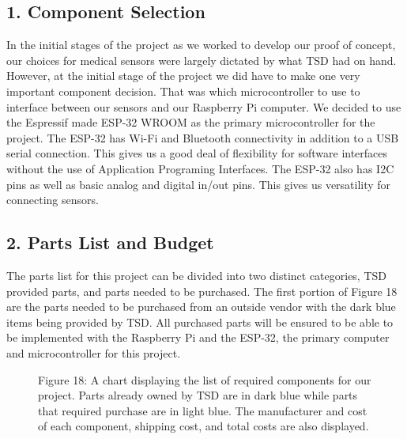 ﻿\documentclass[10pt]{article}
\begin{document}
\subsection{1. Component Selection}
In the initial stages of the project as we worked to develop our proof of concept, our choices for medical sensors were largely dictated by what TSD had on hand. However, at the initial stage of the project we did have to make one very important component decision. That was which microcontroller to use to interface between our sensors and our Raspberry Pi computer. We decided to use the Espressif made ESP-32 WROOM as the primary microcontroller for the project. The ESP-32 has Wi-Fi and Bluetooth connectivity in addition to a USB serial connection. This gives us a good deal of flexibility for software interfaces without the use of Application Programing Interfaces. The ESP-32 also has I2C pins as well as basic analog and digital in/out pins. This gives us versatility for connecting sensors.

\subsection{2. Parts List and Budget}
The parts list for this project can be divided into two distinct categories, TSD provided parts, and parts needed to be purchased. The first portion of Figure 18 are the parts needed to be purchased from an outside vendor with the dark blue items being provided by TSD. All purchased parts will be ensured to be able to  be implemented with the Raspberry Pi and the ESP-32, the primary computer and  microcontroller for this project.

%	 
%	 
%	 
%	 
%	 
%	 
%	 
%	 
%	 
\begin{figure}
\caption{ Figure 18: A chart displaying the list of required components for our project. Parts already owned by TSD are in dark blue while parts that required purchase are in light blue. The manufacturer and cost of each component, shipping cost, and total costs are also displayed. }
\label{fig:18}
\end{figure}
\end{document}
